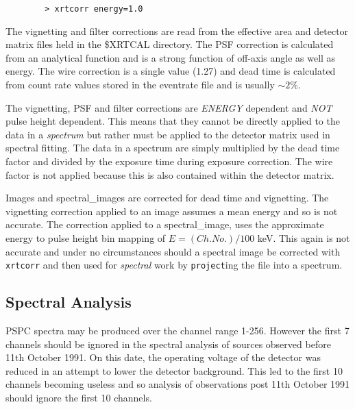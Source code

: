 \documentclass[11pt,fleqn]{article}    %
\begin{document}
\begin{verbatim}
        > xrtcorr energy=1.0
\end{verbatim}

The vignetting and filter corrections are read from the effective
area and detector matrix files held in the \$XRTCAL directory. The PSF
correction is calculated from an analytical function and is a strong
function of off-axis angle as well as energy. The wire correction is a
single value (1.27) and dead time is calculated from count rate values
stored in the eventrate file and is usually $\sim 2\%$.

The vignetting, PSF and filter corrections are {\em ENERGY} dependent
and {\em NOT} pulse height dependent. This means that they cannot be
directly applied to the data in a {\em spectrum} but rather must be applied
to the detector matrix used in spectral fitting.
The data in a spectrum are simply multiplied by the dead time factor
and divided by the exposure time during exposure correction. The wire
factor is not applied because this is also contained within the detector 
matrix.

Images and spectral\_images are corrected for dead time and vignetting.
The vignetting correction applied to an image assumes a mean energy
and so is not accurate. The correction applied to a spectral\_image,
uses the approximate energy to pulse height bin mapping of 
$E=(Ch.No.) / 100$ keV. This again is not accurate and under no circumstances
should a spectral image be corrected with {\tt xrtcorr} and then used for
{\em spectral} work by {\tt project}ing the file into a spectrum.

\subsection{Spectral Analysis}
PSPC spectra may be produced over the channel range 1-256.  However the first
7 channels should be ignored in the spectral analysis of sources observed
before 11th October 1991. On this date, the operating voltage of the
detector was reduced in an attempt to lower the detector background. This
led to the first 10 channels becoming useless and so analysis of
observations post 11th October 1991 should ignore the first 10 channels. 
\end{document}
